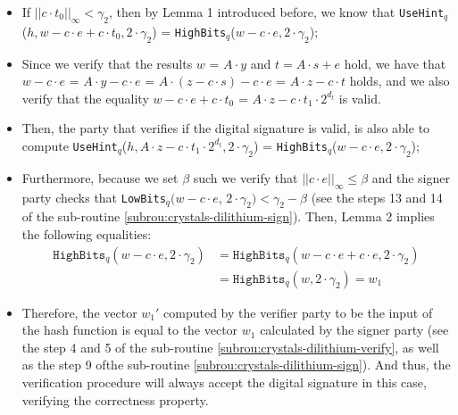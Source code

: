 \documentclass[runningheads]{llncs}
\numberwithin{equation}{section}
\begin{document}
    \begin{itemize}
        \item If ${\big|\big| c \cdot {t}_{0} \big|\big|}_{\infty} < {\gamma}_{2}$, then by Lemma 1 introduced before, we know that \texttt{UseHint}${}_{q}$($h, w - c \cdot e + c \cdot {t}_{0}, 2 \cdot {\gamma}_{2}$) = \texttt{HighBits}${}_{q}$($w - c \cdot e, 2 \cdot {\gamma}_{2}$);
        \item Since we verify that the results $w$ = $A \cdot y$ and $t = A \cdot s + e$ hold, we have that $w - c \cdot e$ = $A \cdot y - c \cdot e$ = $A \cdot (z - c \cdot s) - c \cdot e$ = $A \cdot z - c \cdot t$ holds, and we also verify that the equality $w - c \cdot e + c \cdot {t}_{0}$ = $A \cdot z - c \cdot {t}_{1} \cdot {2}^{{d}_{t}}$ is valid.
        \item Then, the party that verifies if the digital signature is valid, is also able to compute \texttt{UseHint}${}_{q}$($h, A \cdot z - c \cdot {t}_{1} \cdot {2}^{{d}_{t}}, 2 \cdot {\gamma}_{2}$) = \texttt{HighBits}${}_{q}$($w - c \cdot e, 2 \cdot {\gamma}_{2}$);
        \item Furthermore, because we set $\beta$ such we verify that ${||c \cdot e||}_{\infty} \leq \beta$ and the signer party checks that \texttt{LowBits}${}_{q}$$(w - c \cdot e$, $2 \cdot {\gamma}_{2}) < {\gamma}_{2} - \beta$ (see the steps 13 and 14 of the sub-routine \ref{subrou:crystals-dilithium-sign}). Then, Lemma 2 implies the following equalities:
        \begin{equation*} \label{eq1}
            \begin{split}
                \mathrm{\texttt{HighBits}}{}_{q}(w - c \cdot e, 2 \cdot {\gamma}_{2}) & = \mathrm{\texttt{HighBits}}{}_{q}(w - c \cdot e + c \cdot e, 2 \cdot {\gamma}_{2})\\
                 & = \mathrm{\texttt{HighBits}}{}_{q}(w , 2 \cdot {\gamma}_{2}) = {w}_{1}
            \end{split}
        \end{equation*}
        \item Therefore, the vector ${w}_{1}'$ computed by the verifier party to be the input of the hash function is equal to the vector ${w}_{1}$ calculated by the signer party (see the step 4 and 5 of the sub-routine \ref{subrou:crystals-dilithium-verify}, as well as the step 9 of\break the sub-routine \ref{subrou:crystals-dilithium-sign}). And thus, the verification procedure will always accept the digital signature in this case, verifying the correctness property.
    \end{itemize}
        
\end{document}
